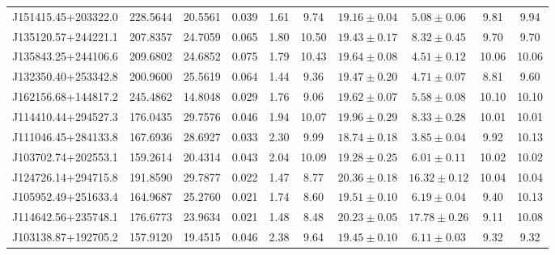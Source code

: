 \documentclass[fleqn,usenatbib]{mnras}
\begin{document}
\begin{table*}
\begin{tabular}{lccccccccc}
J151415.45+203322.0	&	228.5644	&	20.5561	&	0.039	&	1.61	&	9.74	&	$	19.16	\pm	0.04	$	&	$	5.08	\pm	0.06	$	&	9.81	&	9.94	\\
J135120.57+244221.1	&	207.8357	&	24.7059	&	0.065	&	1.80	&	10.50	&	$	19.43	\pm	0.17	$	&	$	8.32	\pm	0.45	$	&	9.70	&	9.70	\\
J135843.25+244106.6	&	209.6802	&	24.6852	&	0.075	&	1.79	&	10.43	&	$	19.64	\pm	0.08	$	&	$	4.51	\pm	0.12	$	&	10.06	&	10.06	\\
J132350.40+253342.8	&	200.9600	&	25.5619	&	0.064	&	1.44	&	9.36	&	$	19.47	\pm	0.20	$	&	$	4.71	\pm	0.07	$	&	8.81	&	9.60	\\
J162156.68+144817.2	&	245.4862	&	14.8048	&	0.029	&	1.76	&	9.06	&	$	19.62	\pm	0.07	$	&	$	5.58	\pm	0.08	$	&	10.10	&	10.10	\\
J114410.44+294527.3	&	176.0435	&	29.7576	&	0.046	&	1.94	&	10.07	&	$	19.96	\pm	0.29	$	&	$	8.33	\pm	0.28	$	&	10.01	&	10.01	\\
J111046.45+284133.8	&	167.6936	&	28.6927	&	0.033	&	2.30	&	9.99	&	$	18.74	\pm	0.18	$	&	$	3.85	\pm	0.04	$	&	9.92	&	10.13	\\
J103702.74+202553.1	&	159.2614	&	20.4314	&	0.043	&	2.04	&	10.09	&	$	19.28	\pm	0.25	$	&	$	6.01	\pm	0.11	$	&	10.02	&	10.02	\\
J124726.14+294715.8	&	191.8590	&	29.7877	&	0.022	&	1.47	&	8.77	&	$	20.36	\pm	0.18	$	&	$	16.32	\pm	0.12	$	&	10.04	&	10.04	\\
J105952.49+251633.4	&	164.9687	&	25.2760	&	0.021	&	1.74	&	8.60	&	$	19.51	\pm	0.10	$	&	$	6.19	\pm	0.04	$	&	9.40	&	10.13	\\
J114642.56+235748.1	&	176.6773	&	23.9634	&	0.021	&	1.48	&	8.48	&	$	20.23	\pm	0.05	$	&	$	17.78	\pm	0.26	$	&	9.11	&	10.08	\\
J103138.87+192705.2	&	157.9120	&	19.4515	&	0.046	&	2.38	&	9.64	&	$	19.45	\pm	0.10	$	&	$	6.11	\pm	0.03	$	&	9.32	&	9.32	\\
\end{tabular}
\end{table*}
\end{document}
